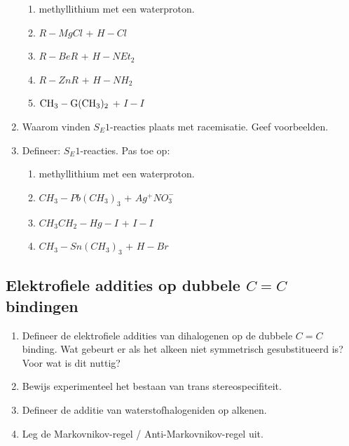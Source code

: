\documentclass[a4paper,12pt]{article}
\begin{document}
\begin{enumerate}
        \begin{enumerate}
            \item methyllithium met een waterproton.
            \item $R-MgCl$ + $H-Cl$ 
            \item $R-BeR$ + $H-NEt_2$
            \item $R-ZnR$ + $H-NH_2$
            \item $\ce{CH3}-\ce{G(CH3)_2}$ + $I-I$
        \end{enumerate}
        \item Waarom vinden $S_E1$-reacties plaats met racemisatie. Geef voorbeelden.
        \item Defineer: $S_E1$-reacties.  Pas toe op:
        \begin{enumerate}
            \item methyllithium met een waterproton.
            \item $CH_3-Pb(CH_3)_3$ + $Ag^+NO_3^-$ 
            \item $CH_3CH_2-Hg-I$ + $I-I$
            \item $CH_3-Sn(CH_3)_3$ + $H-Br$
        \end{enumerate}
    \end{enumerate}
    \subsection*{Elektrofiele addities op dubbele $C=C$ bindingen}
    \begin{enumerate}
        \item Defineer de elektrofiele addities van dihalogenen op de dubbele $C=C$ binding.  Wat gebeurt er als het alkeen niet symmetrisch gesubstitueerd is? Voor wat is dit nuttig?
        \item Bewijs experimenteel het bestaan van trans stereospecifiteit.
        \item Defineer de additie van waterstofhalogeniden op alkenen.
        \item Leg de Markovnikov-regel / Anti-Markovnikov-regel uit.
    \end{enumerate}
\end{document}
